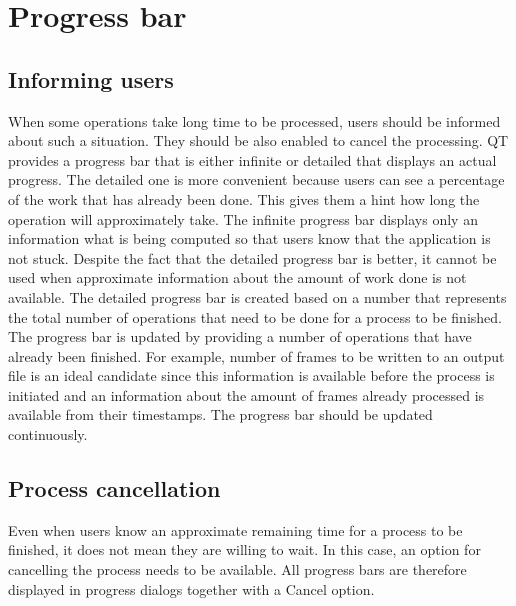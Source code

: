 \section{Progress bar}\label{sec:progress_bar}
\subsection{Informing users}
When some operations take long time to be processed, users should be informed about such a situation. They should be also enabled to cancel the processing. QT provides a progress bar that is either infinite or detailed that displays an actual progress. The detailed one is more convenient because users can see a percentage of the work that has already been done. This gives them a hint how long the operation will approximately take. The infinite progress bar displays only an information what is being computed so that users know that the application is not stuck. Despite the fact that the detailed progress bar is better, it cannot be used when approximate information about the amount of work done is not available. The detailed progress bar is created based on a number that represents the total number of operations that need to be done for a process to be finished. The progress bar is updated by providing a number of operations that have already been finished. For example, number of frames to be written to an output file is an ideal candidate since this information is available before the process is initiated and an information about the amount of frames already processed is available from their timestamps. The progress bar should be updated continuously. 

\subsection{Process cancellation} 
Even when users know an approximate remaining time for a process to be finished, it does not mean they are willing to wait. In this case, an option for cancelling the process needs to be available. All progress bars are therefore displayed in progress dialogs together with a Cancel option.

